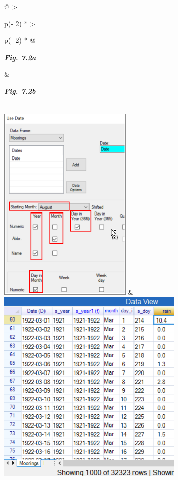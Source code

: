 \documentclass[
  letterpaper,
  DIV=11,
  numbers=noendperiod]{scrreprt}
\begin{document}
\begin{longtable}[]{@{}
  >{\raggedright\arraybackslash}p{(\columnwidth - 2\tabcolsep) * }
  >{\raggedright\arraybackslash}p{(\columnwidth - 2\tabcolsep) * }@{}}
\toprule\noalign{}
\begin{minipage}[b]{\linewidth}\raggedright
\textbf{\emph{Fig. 7.2a}}
\end{minipage} & \begin{minipage}[b]{\linewidth}\raggedright
\textbf{\emph{Fig. 7.2b}}
\end{minipage} \\
\midrule\noalign{}
\endhead
\bottomrule\noalign{}
\endlastfoot
\includegraphics[width=2.5082in,height=3.75452in]{figures/Fig7.2a.png} &
\includegraphics[width=3.49513in,height=3.68764in]{figures/Fig7.2b.png} \\
\end{longtable}
\end{document}

